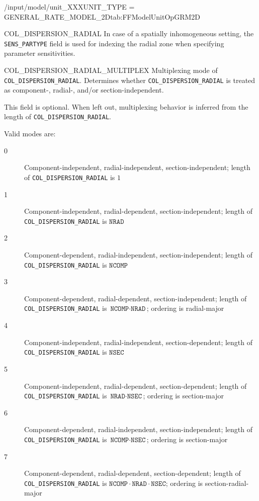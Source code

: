 \begin{condsubgroup}{/input/model/unit\_XXX}{UNIT\_TYPE = GENERAL\_RATE\_MODEL\_2D}{tab:FFModelUnitOpGRM2D}
\begin{dataset}[unit=\si{\square\metre\of{IV}\per\second},type=double,range={$\geq 0$},length={see \texttt{COL\_DISPERSION\_RADIAL\_MULTIPLEX}}]{COL\_DISPERSION\_RADIAL}
    In case of a spatially inhomogeneous setting, the \texttt{SENS\_PARTYPE} field is used for indexing the radial zone when specifying parameter sensitivities.
  \end{dataset}
  \begin{dataset}[unit=--,type=int,range={$\{0, \dots, 7 \}$},length={1}]{COL\_DISPERSION\_RADIAL\_MULTIPLEX}
    Multiplexing mode of \texttt{COL\_DISPERSION\_RADIAL}.
    Determines whether \texttt{COL\_DISPERSION\_RADIAL} is treated as component-, radial-, and/or section-independent.

    This field is optional.
    When left out, multiplexing behavior is inferred from the length of \texttt{COL\_DISPERSION\_RADIAL}.

    Valid modes are:
    \begin{description}
      \item[0] Component-independent, radial-independent, section-independent; length of \texttt{COL\_DISPERSION\_RADIAL} is $1$
      \item[1] Component-independent, radial-dependent, section-independent; length of \texttt{COL\_DISPERSION\_RADIAL} is $\texttt{NRAD}$
      \item[2] Component-dependent, radial-independent, section-independent; length of \texttt{COL\_DISPERSION\_RADIAL} is $\texttt{NCOMP}$
      \item[3] Component-dependent, radial-dependent, section-independent; length of \texttt{COL\_DISPERSION\_RADIAL} is $\texttt{NCOMP} \cdot \texttt{NRAD}$; ordering is radial-major
      \item[4] Component-independent, radial-independent, section-dependent; length of \texttt{COL\_DISPERSION\_RADIAL} is $\texttt{NSEC}$
      \item[5] Component-independent, radial-dependent, section-dependent; length of \texttt{COL\_DISPERSION\_RADIAL} is $\texttt{NRAD} \cdot \texttt{NSEC}$; ordering is section-major
      \item[6] Component-dependent, radial-independent, section-independent; length of \texttt{COL\_DISPERSION\_RADIAL} is $\texttt{NCOMP} \cdot \texttt{NSEC}$; ordering is section-major
      \item[7] Component-dependent, radial-dependent, section-dependent; length of \texttt{COL\_DISPERSION\_RADIAL} is $\texttt{NCOMP} \cdot \texttt{NRAD} \cdot \texttt{NSEC}$; ordering is section-radial-major
    \end{description}\vspace{-\baselineskip}

\end{dataset}
\end{condsubgroup}
